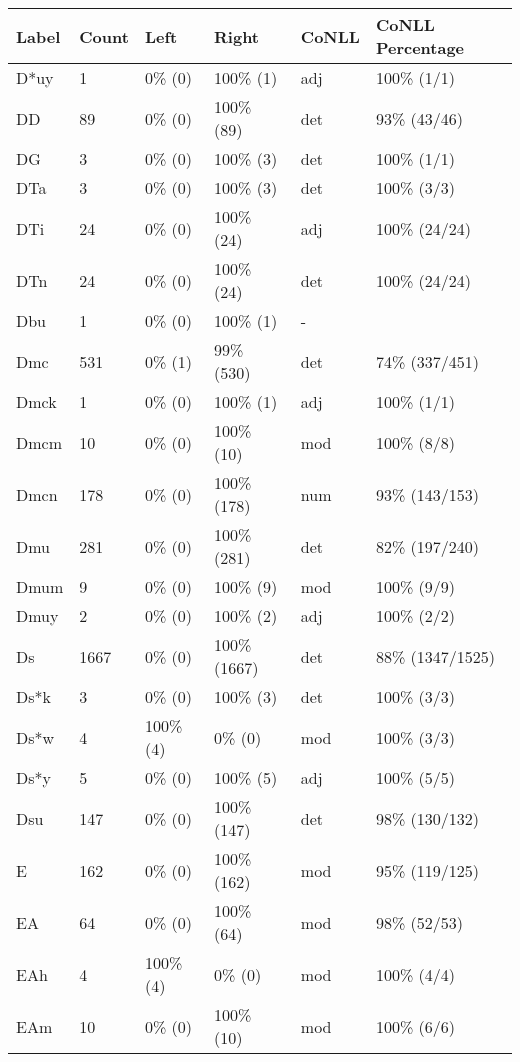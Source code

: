 \begin{figure*}
\begin{tabular}{|l|l|l|l||l|l|}
\hline
Label & Count & Left & Right & CoNLL & CoNLL Percentage\\ 
\hline
 D*uy & 1 & 0\% (0) & 100\% (1) & adj & 100\% (1/1) \\ 
\hline
 DD & 89 & 0\% (0) & 100\% (89) & det & 93\% (43/46) \\ 
\hline
 DG & 3 & 0\% (0) & 100\% (3) & det & 100\% (1/1) \\ 
\hline
 DTa & 3 & 0\% (0) & 100\% (3) & det & 100\% (3/3) \\ 
\hline
 DTi & 24 & 0\% (0) & 100\% (24) & adj & 100\% (24/24) \\ 
\hline
 DTn & 24 & 0\% (0) & 100\% (24) & det & 100\% (24/24) \\ 
\hline
 Dbu & 1 & 0\% (0) & 100\% (1) & - &  \\ 
\hline
 Dmc & 531 & 0\% (1) & 99\% (530) & det & 74\% (337/451) \\ 
\hline
 Dmck & 1 & 0\% (0) & 100\% (1) & adj & 100\% (1/1) \\ 
\hline
 Dmcm & 10 & 0\% (0) & 100\% (10) & mod & 100\% (8/8) \\ 
\hline
 Dmcn & 178 & 0\% (0) & 100\% (178) & num & 93\% (143/153) \\ 
\hline
 Dmu & 281 & 0\% (0) & 100\% (281) & det & 82\% (197/240) \\ 
\hline
 Dmum & 9 & 0\% (0) & 100\% (9) & mod & 100\% (9/9) \\ 
\hline
 Dmuy & 2 & 0\% (0) & 100\% (2) & adj & 100\% (2/2) \\ 
\hline
 Ds & 1667 & 0\% (0) & 100\% (1667) & det & 88\% (1347/1525) \\ 
\hline
 Ds*k & 3 & 0\% (0) & 100\% (3) & det & 100\% (3/3) \\ 
\hline
 Ds*w & 4 & 100\% (4) & 0\% (0) & mod & 100\% (3/3) \\ 
\hline
 Ds*y & 5 & 0\% (0) & 100\% (5) & adj & 100\% (5/5) \\ 
\hline
 Dsu & 147 & 0\% (0) & 100\% (147) & det & 98\% (130/132) \\ 
\hline
 E & 162 & 0\% (0) & 100\% (162) & mod & 95\% (119/125) \\ 
\hline
 EA & 64 & 0\% (0) & 100\% (64) & mod & 98\% (52/53) \\ 
\hline
 EAh & 4 & 100\% (4) & 0\% (0) & mod & 100\% (4/4) \\ 
\hline
 EAm & 10 & 0\% (0) & 100\% (10) & mod & 100\% (6/6) \\ 

\end{tabular}
\end{figure*}
